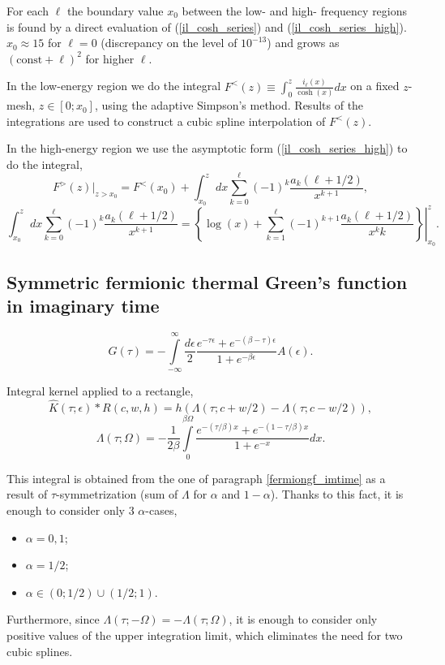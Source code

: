 \documentclass[]{article}
\begin{document}
For each $\ell$ the boundary value $x_0$ between the low- and high- frequency regions is found by a direct evaluation of (\ref{il_cosh_series}) and (\ref{il_cosh_series_high}). $x_0\approx15$ for $\ell=0$ (discrepancy on the level of $10^{-13}$) and grows as $(\mathrm{const}+\ell)^2$ for higher $\ell$.

In the low-energy region we do the integral $F^<(z) \equiv \int_0^z \frac{i_\ell(x)}{\cosh(x)} dx$ on a fixed $z$-mesh, $z\in[0;x_0]$, using the adaptive Simpson's method. Results of the integrations are used to construct a cubic spline interpolation of $F^<(z)$.

In the high-energy region we use the asymptotic form (\ref{il_cosh_series_high}) to do the integral,
\begin{equation}
	F^>(z)|_{z>x_0} = F^<(x_0) +
		\int_{x_0}^z dx \sum_{k=0}^\ell(-1)^k \frac{a_k(\ell+1/2)}{x^{k+1}},
\end{equation}
\begin{equation}
	\int_{x_0}^z dx \sum_{k=0}^\ell(-1)^k \frac{a_k(\ell+1/2)}{x^{k+1}} =
	\left.\left\{
		\log(x) +
		\sum_{k=1}^\ell (-1)^{k+1}\frac{a_k(\ell+1/2)}{x^k k}
	\right\}\right|_{x_0}^z.
\end{equation}

\subsection{Symmetric fermionic thermal Green's function in imaginary time}
\label{fermiongfsymm_imtime}

\begin{equation}
    G(\tau) = -\int\limits_{-\infty}^\infty
    \frac{d\epsilon}{2} \frac{e^{-\tau\epsilon} + e^{-(\beta-\tau)\epsilon}}
        {1+e^{-\beta\epsilon}} A(\epsilon).
\end{equation}

Integral kernel applied to a rectangle,
\begin{equation}
    \hat K(\tau;\epsilon)*R(c,w,h) =
    h(\Lambda(\tau;c+w/2) - \Lambda(\tau;c-w/2)),
\end{equation}
\begin{equation}
    \Lambda(\tau;\Omega) = -\frac{1}{2\beta}
    \int\limits_0^{\beta\Omega}
    \frac{e^{-(\tau/\beta)x} + e^{-(1-\tau/\beta)x}}
    {1+e^{-x}}
    dx.
\end{equation}

This integral is obtained from the one of paragraph \ref{fermiongf_imtime}
as a result of $\tau$-symmetrization (sum of $\Lambda$ for $\alpha$ and $1-\alpha$).
Thanks to this fact, it is enough to consider only 3 $\alpha$-cases,
\begin{itemize}
    \item $\alpha=0,1$;
    \item $\alpha=1/2$;
    \item $\alpha\in(0;1/2)\cup(1/2;1)$.
\end{itemize}
Furthermore, since $\Lambda(\tau;-\Omega) = -\Lambda(\tau;\Omega)$, it is enough to consider only positive values of the upper integration limit, which eliminates the need for two cubic splines.
\end{document}

